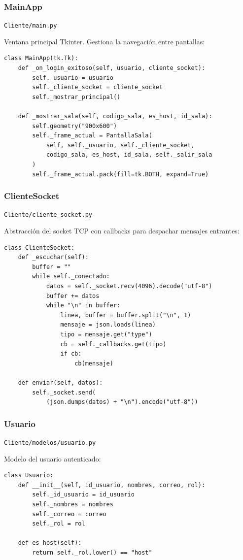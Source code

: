 \documentclass[12pt,a4paper]{article}
\begin{document}
\subsubsection{MainApp}
\texttt{Cliente/main.py}

Ventana principal Tkinter. Gestiona la navegaci\'on entre pantallas:

\begin{lstlisting}
class MainApp(tk.Tk):
    def _on_login_exitoso(self, usuario, cliente_socket):
        self._usuario = usuario
        self._cliente_socket = cliente_socket
        self._mostrar_principal()

    def _mostrar_sala(self, codigo_sala, es_host, id_sala):
        self.geometry("900x600")
        self._frame_actual = PantallaSala(
            self, self._usuario, self._cliente_socket,
            codigo_sala, es_host, id_sala, self._salir_sala
        )
        self._frame_actual.pack(fill=tk.BOTH, expand=True)
\end{lstlisting}

\subsubsection{ClienteSocket}
\texttt{Cliente/cliente\_socket.py}

Abstracci\'on del socket TCP con callbacks para despachar mensajes entrantes:

\begin{lstlisting}
class ClienteSocket:
    def _escuchar(self):
        buffer = ""
        while self._conectado:
            datos = self._socket.recv(4096).decode("utf-8")
            buffer += datos
            while "\n" in buffer:
                linea, buffer = buffer.split("\n", 1)
                mensaje = json.loads(linea)
                tipo = mensaje.get("type")
                cb = self._callbacks.get(tipo)
                if cb:
                    cb(mensaje)

    def enviar(self, datos):
        self._socket.send(
            (json.dumps(datos) + "\n").encode("utf-8"))
\end{lstlisting}

\subsubsection{Usuario}
\texttt{Cliente/modelos/usuario.py}

Modelo del usuario autenticado:

\begin{lstlisting}
class Usuario:
    def __init__(self, id_usuario, nombres, correo, rol):
        self._id_usuario = id_usuario
        self._nombres = nombres
        self._correo = correo
        self._rol = rol

    def es_host(self):
        return self._rol.lower() == "host"
\end{lstlisting}
\end{document}
